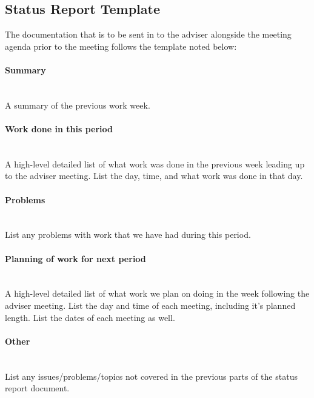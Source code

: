\documentclass[../document]{subfiles}
\begin{document}
\subsection{Status Report Template}
The documentation that is to be sent in to the adviser alongside the meeting agenda prior to the meeting follows the template noted below:

\paragraph{Summary} \ \\
A summary of the previous work week.

\paragraph{Work done in this period} \ \\
A high-level detailed list of what work was done in the previous week leading up to the adviser meeting. List the day, time, and what work was done in that day.

\paragraph{Problems} \ \\
List any problems with work that we have had during this period.

\paragraph{Planning of work for next period} \ \\
A high-level detailed list of what work we plan on doing in the week following the adviser meeting. List the day and time of each meeting, including it’s planned length. List the dates of each meeting as well.

\paragraph{Other} \ \\
List any issues/problems/topics not covered in the previous parts of the status report document.
\end{document}
